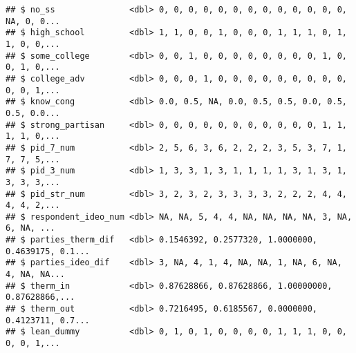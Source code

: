 \documentclass[
]{article}
\newenvironment{Shaded}{\begin{snugshade}}{\end{snugshade}}
\newcommand{\CommentTok}[1]{\textcolor[rgb]{0.56,0.35,0.01}{\textit{#1}}}
\newcommand{\DataTypeTok}[1]{\textcolor[rgb]{0.13,0.29,0.53}{#1}}
\newcommand{\KeywordTok}[1]{\textcolor[rgb]{0.13,0.29,0.53}{\textbf{#1}}}
\newcommand{\NormalTok}[1]{#1}
\newcommand{\OperatorTok}[1]{\textcolor[rgb]{0.81,0.36,0.00}{\textbf{#1}}}
\newcommand{\OtherTok}[1]{\textcolor[rgb]{0.56,0.35,0.01}{#1}}
\newcommand{\StringTok}[1]{\textcolor[rgb]{0.31,0.60,0.02}{#1}}
\begin{document}
\begin{verbatim}
## $ no_ss               <dbl> 0, 0, 0, 0, 0, 0, 0, 0, 0, 0, 0, 0, 0, NA, 0, 0...
## $ high_school         <dbl> 1, 1, 0, 0, 1, 0, 0, 0, 1, 1, 1, 0, 1, 1, 0, 0,...
## $ some_college        <dbl> 0, 0, 1, 0, 0, 0, 0, 0, 0, 0, 0, 1, 0, 0, 1, 0,...
## $ college_adv         <dbl> 0, 0, 0, 1, 0, 0, 0, 0, 0, 0, 0, 0, 0, 0, 0, 1,...
## $ know_cong           <dbl> 0.0, 0.5, NA, 0.0, 0.5, 0.5, 0.0, 0.5, 0.5, 0.0...
## $ strong_partisan     <dbl> 0, 0, 0, 0, 0, 0, 0, 0, 0, 0, 0, 1, 1, 1, 1, 0,...
## $ pid_7_num           <dbl> 2, 5, 6, 3, 6, 2, 2, 2, 3, 5, 3, 7, 1, 7, 7, 5,...
## $ pid_3_num           <dbl> 1, 3, 3, 1, 3, 1, 1, 1, 1, 3, 1, 3, 1, 3, 3, 3,...
## $ pid_str_num         <dbl> 3, 2, 3, 2, 3, 3, 3, 3, 2, 2, 2, 4, 4, 4, 4, 2,...
## $ respondent_ideo_num <dbl> NA, NA, 5, 4, 4, NA, NA, NA, NA, 3, NA, 6, NA, ...
## $ parties_therm_dif   <dbl> 0.1546392, 0.2577320, 1.0000000, 0.4639175, 0.1...
## $ parties_ideo_dif    <dbl> 3, NA, 4, 1, 4, NA, NA, 1, NA, 6, NA, 4, NA, NA...
## $ therm_in            <dbl> 0.87628866, 0.87628866, 1.00000000, 0.87628866,...
## $ therm_out           <dbl> 0.7216495, 0.6185567, 0.0000000, 0.4123711, 0.7...
## $ lean_dummy          <dbl> 0, 1, 0, 1, 0, 0, 0, 0, 1, 1, 1, 0, 0, 0, 0, 1,...
\end{verbatim}

\begin{Shaded}
\end{Shaded}
\end{document}
